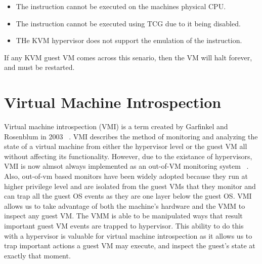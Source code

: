 \documentclass{report}
\begin{document}
\begin{spacing}{1.5}
{\begin{itemize}
\item  The instruction cannot be executed on the machines physical CPU.
\item  The instruction cannot be executed using TCG due to it being disabled.
\item  THe KVM hypervisor does not support the emulation of the instruction.

\end{itemize}

\leavevmode\newline
If any KVM guest VM comes across this senario, then the VM will halt forever, and must be restarted.
}








\section{Virtual Machine Introspection}

{\large
Virtual machine introspection (VMI) is a term created by Garfinkel and Rosenblum in 2003 ~\cite{garfinkel2003virtual}. VMI describes the method of monitoring and analyzing the state of a virtual machine from either the hypervisor level or the guest VM all without affecting its functionality. However, due to the existance of hypervisors, VMI is now almsot always implemented as an out-of-VM monitoring system ~\cite{bhatt2018using}. Also, out-of-vm based monitors have been widely adopted because they run at higher privilege level and are isolated from the guest VMs that they monitor and can trap all the guest OS events as they are one layer below the guest OS. VMI allows us to take advantage of both the machine's hardware and the VMM to inspect any guest VM. The VMM is able to be manipulated ways that result important guest VM events are trapped to hypervisor. This ability to do this with a hypervisor is valuable for virtual machine introspection as it allows us to trap important actions a guest VM may execute, and inspect the guest’s state at exactly that moment.
\newline
}







\end{spacing}
\end{document}
